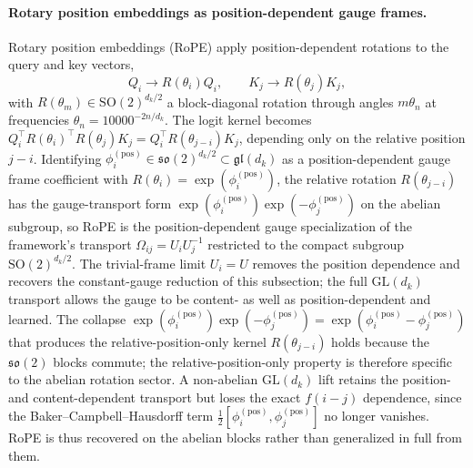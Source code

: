 \documentclass[11pt]{article}
\begin{document}
\paragraph{Rotary position embeddings as position-dependent gauge frames.}
Rotary position embeddings (RoPE) \cite{su2024roformer} apply position-dependent rotations to the query and key vectors,
\begin{equation}
Q_i \to R(\theta_i) Q_i, \qquad K_j \to R(\theta_j) K_j,
\label{eq:rope_apply}
\end{equation}
with $R(\theta_m) \in \mathrm{SO}(2)^{d_k/2}$ a block-diagonal rotation through angles $m\theta_n$ at frequencies $\theta_n = 10000^{-2n/d_k}$. The logit kernel becomes $Q_i^\top R(\theta_i)^\top R(\theta_j) K_j = Q_i^\top R(\theta_{j-i}) K_j$, depending only on the relative position $j - i$. Identifying $\phi_i^{(\mathrm{pos})} \in \mathfrak{so}(2)^{d_k/2} \subset \mathfrak{gl}(d_k)$ as a position-dependent gauge frame coefficient with $R(\theta_i) = \exp(\phi_i^{(\mathrm{pos})})$, the relative rotation $R(\theta_{j-i})$ has the gauge-transport form $\exp(\phi_i^{(\mathrm{pos})})\exp(-\phi_j^{(\mathrm{pos})})$ on the abelian subgroup, so RoPE is the position-dependent gauge specialization of the framework's transport $\Omega_{ij} = U_iU_j^{-1}$ restricted to the compact subgroup $\mathrm{SO}(2)^{d_k/2}$. The trivial-frame limit $U_i = U$ removes the position dependence and recovers the constant-gauge reduction of this subsection; the full $\mathrm{GL}(d_k)$ transport allows the gauge to be content- as well as position-dependent and learned. The collapse $\exp(\phi_i^{(\mathrm{pos})})\exp(-\phi_j^{(\mathrm{pos})}) = \exp(\phi_i^{(\mathrm{pos})} - \phi_j^{(\mathrm{pos})})$ that produces the relative-position-only kernel $R(\theta_{j-i})$ holds because the $\mathfrak{so}(2)$ blocks commute; the relative-position-only property is therefore specific to the abelian rotation sector. A non-abelian $\mathrm{GL}(d_k)$ lift retains the position- and content-dependent transport but loses the exact $f(i-j)$ dependence, since the Baker--Campbell--Hausdorff term $\tfrac{1}{2}[\phi_i^{(\mathrm{pos})}, \phi_j^{(\mathrm{pos})}]$ no longer vanishes. RoPE is thus recovered on the abelian blocks rather than generalized in full from them.
\end{document}
